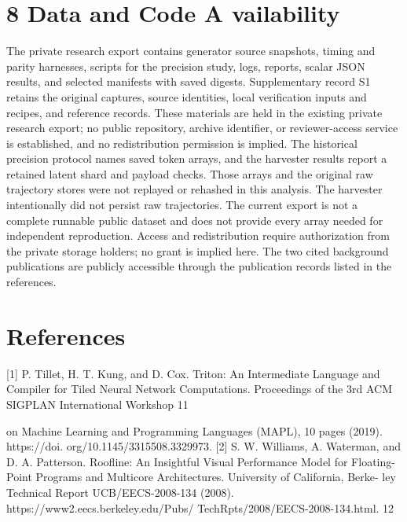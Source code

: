 \documentclass[11pt]{article}
\begin{document}
\section*{8 Data and Code A vailability}

The private research export contains generator source snapshots, timing and parity harnesses,
scripts for the precision study, logs, reports, scalar JSON results, and selected manifests with saved
digests. Supplementary record S1 retains the original captures, source identities, local verification
inputs and recipes, and reference records. These materials are held in the existing private research
export; no public repository, archive identifier, or reviewer-access service is established, and no
redistribution permission is implied.
The historical precision protocol names saved token arrays, and the harvester results report a
retained latent shard and payload checks. Those arrays and the original raw trajectory stores
were not replayed or rehashed in this analysis. The harvester intentionally did not persist raw
trajectories. The current export is not a complete runnable public dataset and does not provide
every array needed for independent reproduction. Access and redistribution require authorization
from the private storage holders; no grant is implied here. The two cited background publications
are publicly accessible through the publication records listed in the references.

\section*{References}

[1] P. Tillet, H. T. Kung, and D. Cox. Triton: An Intermediate Language and Compiler for Tiled
Neural Network Computations. Proceedings of the 3rd ACM SIGPLAN International Workshop
11

on Machine Learning and Programming Languages (MAPL), 10 pages (2019). https://doi.
org/10.1145/3315508.3329973.
[2] S. W. Williams, A. Waterman, and D. A. Patterson. Roofline: An Insightful Visual Performance
Model for Floating-Point Programs and Multicore Architectures. University of California, Berke-
ley Technical Report UCB/EECS-2008-134 (2008). https://www2.eecs.berkeley.edu/Pubs/
TechRpts/2008/EECS-2008-134.html.
12
\end{document}
